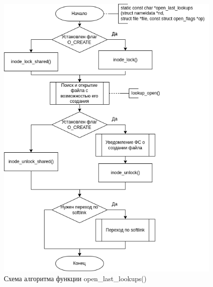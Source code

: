 \documentclass[14pt,a4paper]{scrreprt}
\begin{document}
\begin{figure}[H]
	\begin{center}
		\includegraphics[scale=0.65]{assets/open_last_lookups.png}
	\end{center}
	\caption{Схема алгоритма функции open\_last\_lookups()}
\end{figure}
\end{document}
